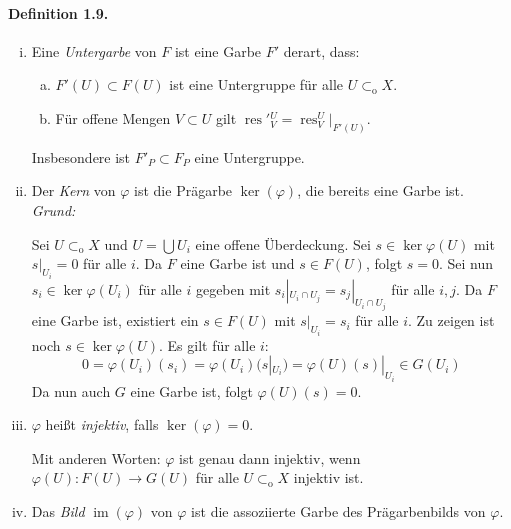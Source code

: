 \paragraph{Definition 1.9.}\label{1.9}
\begin{enumerate}[(i)]
\item Eine \textit{Untergarbe} von $F$ ist eine Garbe $F'$ derart, dass:
\begin{enumerate}[(a)]
\item $F'(U)\subset F(U)$ ist eine Untergruppe für alle $U\subset_\text{o}X$.
\item Für offene Mengen $V\subset U$ gilt $\operatorname{res}'{}^U_V=\operatorname{res}^U_V|_{F'(U)}$.
\end{enumerate}
Insbesondere ist $F'_P\subset F_P$ eine Untergruppe.
\item Der \textit{Kern} von $\varphi$ ist die Prägarbe $\ker(\varphi)$, die bereits eine Garbe ist. \textit{Grund:}

Sei $U\subset_\text{o}X$ und $U=\bigcup U_i$ eine offene Überdeckung. Sei $s\in\ker\varphi(U)$ mit $s|_{U_i}=0$ für alle $i$. Da $F$ eine Garbe ist und $s\in F(U)$, folgt $s=0$. Sei nun $s_i\in \ker\varphi(U_i)$ für alle $i$ gegeben mit $s_i|_{U_i\cap U_j}=s_j|_{U_i\cap U_j}$ für alle $i,j$. Da $F$ eine Garbe ist, existiert ein $s\in F(U)$ mit $s|_{U_i}=s_i$ für alle $i$. Zu zeigen ist noch $s\in \ker\varphi(U)$. Es gilt für alle $i$:
\[0=\varphi(U_i)(s_i)=\varphi(U_i)(s|_{U_i}) = \varphi(U)(s)|_{U_i}\in G(U_i) \]
Da nun auch $G$ eine Garbe ist, folgt $\varphi(U)(s)=0$.
\item $\varphi$ heißt \textit{injektiv}, falls $\ker(\varphi)=0$.

Mit anderen Worten: $\varphi$ ist genau dann injektiv, wenn $\varphi(U):F(U)\to G(U)$ für alle $U\subset_\text{o}X$ injektiv ist.
\item Das \textit{Bild} $\operatorname{im}(\varphi)$ von $\varphi$ ist die assoziierte Garbe des Prägarbenbilds von $\varphi$.


\end{enumerate}
